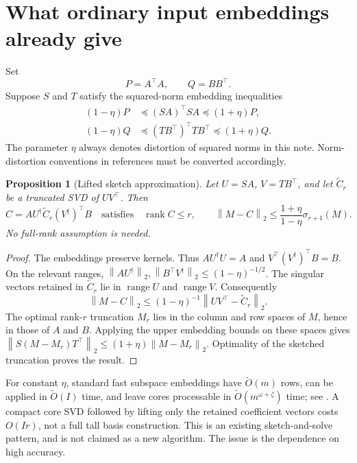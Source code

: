 \documentclass[11pt]{article}
\newtheorem{proposition}[theorem]{Proposition}
\theoremstyle{remark}
\newcommand{\norm}[1]{\left\lVert#1\right\rVert}
\newcommand{\rank}{\operatorname{rank}}
\newcommand{\range}{\operatorname{range}}
\newcommand{\tO}{\widetilde O}
\begin{document}
\section{What ordinary input embeddings already give}
Set
\[
 P=A^\top A,\qquad Q=BB^\top.
\]
Suppose \(S\) and \(T\) satisfy the squared-norm embedding inequalities
\begin{align}
 (1-\eta)P&\preceq (SA)^\top SA\preceq(1+\eta)P,\label{eq:embedding-a}\\
 (1-\eta)Q&\preceq (TB^\top)^\top TB^\top\preceq(1+\eta)Q.
 \label{eq:embedding-b}
\end{align}
The parameter \(\eta\) always denotes distortion of squared norms in this
note. Norm-distortion conventions in references must be converted accordingly.

\begin{proposition}[Lifted sketch approximation]\label{prop:lift}
Let \(U=SA\), \(V=TB^\top\), and let \(\widetilde C_r\) be a truncated
SVD of \(UV^\top\). Then
\[
 C=A U^\dagger\widetilde C_r(V^\dagger)^\top B
 \quad\text{satisfies}\quad
 \rank C\leq r,\qquad
 \norm{M-C}_2\leq\frac{1+\eta}{1-\eta}\sigma_{r+1}(M).
\]
No full-rank assumption is needed.
\end{proposition}
\begin{proof}
The embeddings preserve kernels. Thus \(AU^\dagger U=A\) and
\(V^\top(V^\dagger)^\top B=B\). On the relevant ranges,
\(\norm{AU^\dagger}_2,\norm{B^\top V^\dagger}_2\leq(1-\eta)^{-1/2}\).
The singular vectors retained in \(\widetilde C_r\) lie in \(\range U\)
and \(\range V\). Consequently
\[
 \norm{M-C}_2\leq(1-\eta)^{-1}
       \norm{UV^\top-\widetilde C_r}_2.
\]
The optimal rank-\(r\) truncation \(M_r\) lies in the column and row
spaces of \(M\), hence in those of \(A\) and \(B\). Applying the upper
embedding bounds on these spaces gives
\(\norm{S(M-M_r)T^\top}_2\leq(1+\eta)\norm{M-M_r}_2\).
Optimality of the sketched truncation proves the result.
\end{proof}

For constant \(\eta\), standard fast subspace embeddings have
\(\tO(m)\) rows, can be applied in \(\tO(I)\) time, and leave cores
processable in \(\tO(m^{\omega+\zeta})\) time; see
\cite{cnw,embedding}. A compact core SVD followed by lifting only the
retained coefficient vectors costs \(O(Ir)\), not a full tall basis
construction. This is an existing sketch-and-solve pattern, and is not claimed
as a new algorithm. The issue is the dependence on high accuracy.
\end{document}
